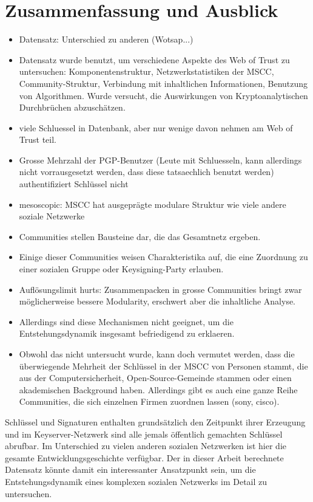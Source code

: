 
\chapter{Zusammenfassung und Ausblick}
\label{ch:Zusammenfassung}

\begin{itemize}

\item Datensatz: Unterschied zu anderen (Wotsap...)

\item Datensatz wurde benutzt, um verschiedene Aspekte des Web of
  Trust zu untersuchen: Komponentenstruktur, Netzwerkstatistiken der
  MSCC, Community-Struktur, Verbindung mit inhaltlichen Informationen,
  Benutzung von Algorithmen. Wurde versucht, die Auswirkungen von
  Kryptoanalytischen Durchbr\"uchen abzusch\"atzen.

\item viele Schluessel in Datenbank, aber nur wenige davon nehmen am
  Web of Trust teil.
\item Grosse Mehrzahl der PGP-Benutzer (Leute mit Schluesseln,
  kann allerdings nicht vorrausgesetzt werden, dass diese tatsaechlich
  benutzt werden) authentifiziert Schl\"ussel nicht
\item mesoscopic: MSCC hat ausgepr\"agte modulare Struktur wie viele andere
  soziale Netzwerke
\item Communities stellen Bausteine dar, die das Gesamtnetz ergeben.
\item Einige dieser Communities weisen Charakteristika auf, die eine
  Zuordnung zu einer sozialen Gruppe oder Keysigning-Party erlauben.
\item Aufl\"osungslimit hurts: Zusammenpacken in grosse Communities
  bringt zwar m\"oglicherweise bessere Modularity, erschwert aber die
  inhaltliche Analyse.
\item Allerdings sind diese Mechanismen nicht geeignet, um die
  Entstehungsdynamik insgesamt befriedigend zu erklaeren.
\item Obwohl das nicht untersucht wurde, kann doch vermutet werden,
  dass die \"uberwiegende Mehrheit der Schl\"ussel in der MSCC von
  Personen stammt, die aus der Computersicherheit,  Open-Source-Gemeinde stammen oder einen
  akademischen Background haben. Allerdings gibt es auch eine ganze
  Reihe Communities, die sich einzelnen Firmen zuordnen lassen (sony,
  cisco). 

\end{itemize}

Schl\"ussel und Signaturen enthalten grunds\"atzlich den Zeitpunkt
ihrer Erzeugung und im Keyserver-Netzwerk sind alle jemals
\"offentlich gemachten Schl\"ussel abrufbar. Im Unterschied zu vielen
anderen sozialen Netzwerken ist hier die gesamte
Entwicklungsgeschichte verf\"ugbar. Der in dieser Arbeit berechnete
Datensatz k\"onnte damit ein interessanter Ansatzpunkt sein, um die
Entstehungsdynamik eines komplexen sozialen Netzwerks im Detail zu
untersuchen.

